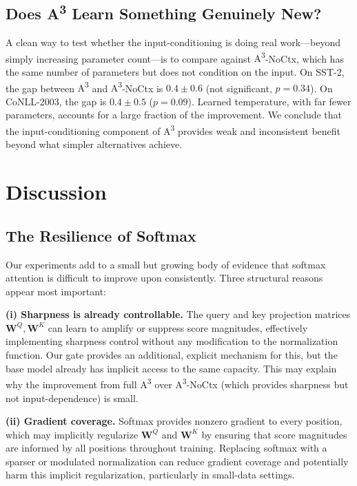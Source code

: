 \documentclass[11pt]{article}
\newcommand{\AAA}{\textsc{A\textsuperscript{3}}}
\newcommand{\bW}{\mathbf{W}}
\begin{document}
\subsection{Does \AAA{} Learn Something Genuinely New?}

A clean way to test whether the input-conditioning is doing real work---beyond simply increasing parameter count---is to compare against \AAA{}-NoCtx, which has the same number of parameters but does not condition on the input. On SST-2, the gap between \AAA{} and \AAA{}-NoCtx is $0.4 \pm 0.6$ (not significant, $p = 0.34$). On CoNLL-2003, the gap is $0.4 \pm 0.5$ ($p = 0.09$). Learned temperature, with far fewer parameters, accounts for a large fraction of the improvement. We conclude that the input-conditioning component of \AAA{} provides weak and inconsistent benefit beyond what simpler alternatives achieve.

\section{Discussion}
\label{sec:discussion}

\subsection{The Resilience of Softmax}

Our experiments add to a small but growing body of evidence that softmax attention is difficult to improve upon consistently. Three structural reasons appear most important:

\textbf{(i) Sharpness is already controllable.} The query and key projection matrices $\bW^Q, \bW^K$ can learn to amplify or suppress score magnitudes, effectively implementing sharpness control without any modification to the normalization function. Our gate provides an additional, explicit mechanism for this, but the base model already has implicit access to the same capacity. This may explain why the improvement from full \AAA{} over \AAA{}-NoCtx (which provides sharpness but not input-dependence) is small.

\textbf{(ii) Gradient coverage.} Softmax provides nonzero gradient to every position, which may implicitly regularize $\bW^Q$ and $\bW^K$ by ensuring that score magnitudes are informed by all positions throughout training. Replacing softmax with a sparser or modulated normalization can reduce gradient coverage and potentially harm this implicit regularization, particularly in small-data settings.
\end{document}
